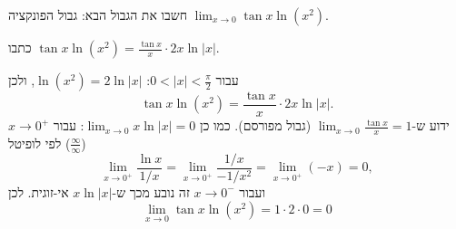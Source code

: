 
\begin{question}
חשבו את הגבול הבא:
גבול הפונקציה $\displaystyle\lim_{x\to0}\tan x\ln(x^2)$.
\end{question}

\begin{hint}
כתבו $\tan x\ln(x^2)=\frac{\tan x}{x}\cdot 2x\ln|x|$.
\end{hint}

\begin{solution}
עבור $0<|x|<\frac\pi2$: $\ln(x^2)=2\ln|x|$, ולכן
\[ \tan x\ln(x^2)=\frac{\tan x}{x}\cdot 2x\ln|x|. \]
ידוע ש-$\lim_{x\to0}\frac{\tan x}{x}=1$ (גבול מפורסם). כמו כן $\lim_{x\to0}x\ln|x|=0$: עבור $x\to0^+$ לפי לופיטל ($\frac\infty\infty$)
\[ \lim_{x\to0^+}\frac{\ln x}{1/x}=\lim_{x\to0^+}\frac{1/x}{-1/x^2}=\lim_{x\to0^+}(-x)=0, \]
ועבור $x\to0^-$ זה נובע מכך ש-$x\ln|x|$ אי-זוגית. לכן
\[ \boxed{\lim_{x\to0}\tan x\ln(x^2)=1\cdot2\cdot0=0} \]
\end{solution}
